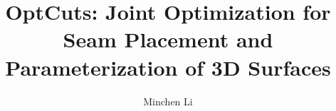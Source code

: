 \documentclass[acmtog, review, anonymous]{acmart}
\begin{document}
\title{OptCuts: Joint Optimization for Seam Placement and Parameterization of 3D Surfaces} 

\author{Minchen Li}

\renewcommand\shortauthors{Li, M. et al}
\end{document}
